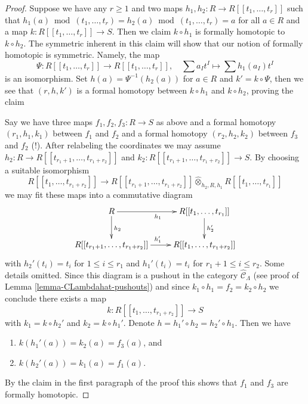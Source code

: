 \begin{proof}
Suppose we have any $r \geq 1$ and two maps
$h_1, h_2 : R \to R[[t_1, \ldots, t_r]]$ such that
$h_1(a) \bmod (t_1, \ldots, t_r) =  h_2(a) \bmod (t_1, \ldots, t_r) = a$
for all $a \in R$ and a map $k : R[[t_1, \ldots, t_r]] \to S$.
Then we claim $k \circ h_1$ is formally homotopic to $k \circ h_2$.
The symmetric inherent in this claim will show that our notion
of formally homotopic is symmetric. Namely, the map
$$
\Psi :
R[[t_1, \ldots, t_r]]
\longrightarrow
R[[t_1, \ldots, t_r]],\quad
\sum a_I t^I \longmapsto \sum h_1(a_I)t^I
$$
is an isomorphism. Set $h(a) = \Psi^{-1}(h_2(a))$ for $a \in R$ and
$k' = k \circ \Psi$, then we see that $(r, h, k')$ is a formal
homotopy between $k \circ h_1$ and $k \circ h_2$, proving the claim

\medskip\noindent
Say we have three maps $f_1, f_2, f_3 : R \to S$ as above
and a formal homotopy $(r_1, h_1, k_1)$ between $f_1$ and $f_2$
and a formal homotopy $(r_2, h_2, k_2)$ between $f_3$ and $f_2$ (!).
After relabeling the coordinates we may assume
$h_2 : R \to R[[t_{r_1 + 1}, \ldots, t_{r_1 + r_2}]]$
and
$k_2 : R[[t_{r_1 + 1}, \ldots, t_{r_1 + r_2}]] \to S$.
By choosing a suitable isomorphism
$$
R[[t_1, \ldots, t_{r_1 + r_2}]]
\longrightarrow
R[[t_{r_1 + 1}, \ldots, t_{r_1 + r_2}]]
\widehat{\otimes}_{h_2, R, h_1}
R[[t_1, \ldots, t_{r_1}]]
$$
we may fit these maps into a commutative diagram
$$
\xymatrix{
R \ar[r]_{h_1} \ar[d]^{h_2} &
R[[t_1, \ldots, t_{r_1}]] \ar[d]^{h_2'} \\
R[[t_{r_1 + 1}, \ldots, t_{r_1 + r_2}]] \ar[r]^{h_1'} &
R[[t_1, \ldots, t_{r_1 + r_2}]]
}
$$
with $h_2'(t_i) = t_i$ for $1 \leq i \leq r_1$ and
$h_1'(t_i) = t_i$ for $r_1 + 1 \leq i \leq r_2$.
Some details omitted.
Since this diagram is a pushout in the category
$\widehat{\mathcal{C}}_\Lambda$ (see proof of
Lemma \ref{lemma-CLambdahat-pushouts})
and since $k_1 \circ h_1 = f_2 = k_2 \circ h_2$ we conclude
there exists a map
$$
k : R[[t_1, \ldots, t_{r_1 + r_2}]] \to S
$$
with $k_1 = k \circ h_2'$ and $k_2 = k \circ h_1'$.
Denote $h = h_1' \circ h_2 = h_2' \circ h_1$.
Then we have
\begin{enumerate}
\item $k(h_1'(a)) = k_2(a) = f_3(a)$, and
\item $k(h_2'(a)) = k_1(a) = f_1(a)$.
\end{enumerate}
By the claim in the first paragraph of the proof this shows that
$f_1$ and $f_3$ are formally homotopic.
\end{proof}

